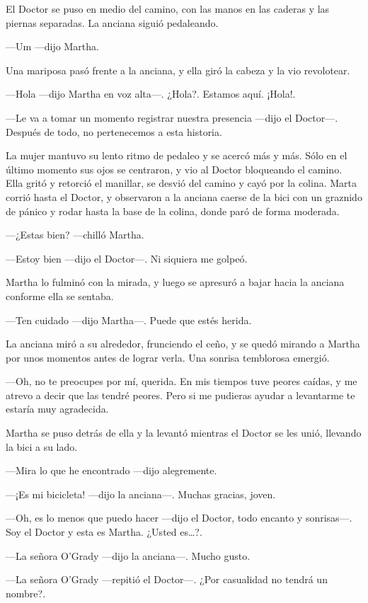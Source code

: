 El Doctor se puso en medio del camino, con las manos en las caderas y las piernas separadas. La anciana siguió pedaleando.

---Um ---dijo Martha.

Una mariposa pasó frente a la anciana, y ella giró la cabeza y la vio revolotear.

---Hola ---dijo Martha en voz alta---. ¿Hola?. Estamos aquí. ¡Hola!.

---Le va a tomar un momento registrar nuestra presencia ---dijo el Doctor---. Después de todo, no pertenecemos a esta historia.

La mujer mantuvo su lento ritmo de pedaleo y se acercó más y más. Sólo en el último momento sus ojos se centraron, y vio al Doctor bloqueando el camino. Ella gritó y retorció el manillar, se desvió del camino y cayó por la colina. Marta corrió hasta el Doctor, y observaron a la anciana caerse de la bici con un graznido de pánico y rodar hasta la base de la colina, donde paró de forma moderada.

---¿Estas bien? ---chilló Martha.

---Estoy bien ---dijo el Doctor---. Ni siquiera me golpeó.

Martha lo fulminó con la mirada, y luego se apresuró a bajar hacia la anciana conforme ella se sentaba.

---Ten cuidado ---dijo Martha---. Puede que estés herida.

La anciana miró a su alrededor, frunciendo el ceño, y se quedó mirando a Martha por unos momentos antes de lograr verla. Una sonrisa temblorosa emergió.

---Oh, no te preocupes por mí, querida. En mis tiempos tuve peores caídas, y me atrevo a decir que las tendré peores. Pero si me pudieras ayudar a levantarme te estaría muy agradecida.

Martha se puso detrás de ella y la levantó mientras el Doctor se les unió, llevando la bici a su lado.

---Mira lo que he encontrado ---dijo alegremente.

---¡Es mi bicicleta! ---dijo la anciana---. Muchas gracias, joven.

---Oh, es lo menos que puedo hacer ---dijo el Doctor, todo encanto y sonrisas---. Soy el Doctor y esta es Martha. ¿Usted es\ldots{}?.

---La señora O'Grady ---dijo la anciana---. Mucho gusto.

---La señora O'Grady ---repitió el Doctor---. ¿Por casualidad no tendrá un nombre?.

